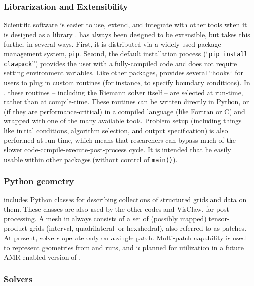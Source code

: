 \subsubsection{Librarization and Extensibility}
Scientific software is easier to use, extend, and integrate with other tools
when it is designed as a library \cite{Brown:2015cj}.  \clawpack has always been
designed to be extensible, but \pyclaw takes this further in several ways.
First, it is distributed via a widely-used package management system,
\texttt{pip}. Second, the default installation process (``\texttt{pip install
clawpack}'') provides the user with a fully-compiled code and does not require
setting environment variables.  Like other \clawpack packages, \pyclaw provides
several ``hooks'' for users to plug in custom routines (for instance, to specify
boundary conditions). In \pyclaw, these routines -- including the Riemann solver
itself -- are selected at run-time, rather than at compile-time.  These routines
can be written directly in Python, or (if they are performance-critical) in a
compiled language (like Fortran or C) and wrapped with one of the many available
tools.  Problem setup (including things like initial conditions, algorithm
selection, and output specification) is also performed at run-time, which means
that researchers can bypass much of the slower code-compile-execute-post-process
cycle. It is intended that \pyclaw be easily usable within other packages
(without control of \texttt{main()}).  

\subsubsection{Python geometry}
\pyclaw includes Python classes for describing collections of structured grids
and data on them. These classes are also used by the other codes and
VisClaw, for post-processing.  A mesh in \clawpack always consists of a set of
(possibly mapped) tensor-product
grids (interval, quadrilateral, or hexahedral), also referred to as patches.
At present, \pyclaw solvers operate only on a single patch.  Multi-patch
capability is used to represent geometries from \amrclaw and \geoclaw runs, and
is planned for utilization in a future AMR-enabled version of \pyclaw.

\subsubsection{\pyclaw Solvers} 

